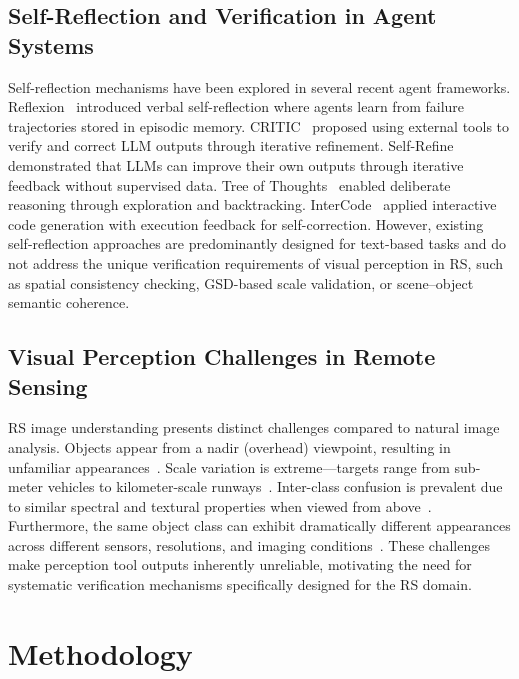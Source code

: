 \documentclass[journal]{IEEEtran}
\begin{document}
\subsection{Self-Reflection and Verification in Agent Systems}

Self-reflection mechanisms have been explored in several recent agent frameworks.
Reflexion~\cite{Reflexion} introduced verbal self-reflection where agents learn from failure trajectories stored in episodic memory.
CRITIC~\cite{CRITIC} proposed using external tools to verify and correct LLM outputs through iterative refinement.
Self-Refine~\cite{SelfRefine} demonstrated that LLMs can improve their own outputs through iterative feedback without supervised data.
Tree of Thoughts~\cite{ToT} enabled deliberate reasoning through exploration and backtracking.
InterCode~\cite{InterCode} applied interactive code generation with execution feedback for self-correction.
However, existing self-reflection approaches are predominantly designed for text-based tasks and do not address the unique verification requirements of visual perception in RS, such as spatial consistency checking, GSD-based scale validation, or scene--object semantic coherence.

\subsection{Visual Perception Challenges in Remote Sensing}

RS image understanding presents distinct challenges compared to natural image analysis.
Objects appear from a nadir (overhead) viewpoint, resulting in unfamiliar appearances~\cite{DOTA}.
Scale variation is extreme---targets range from sub-meter vehicles to kilometer-scale runways~\cite{xView}.
Inter-class confusion is prevalent due to similar spectral and textural properties when viewed from above~\cite{DIOR}.
Furthermore, the same object class can exhibit dramatically different appearances across different sensors, resolutions, and imaging conditions~\cite{FAIR1M}.
These challenges make perception tool outputs inherently unreliable, motivating the need for systematic verification mechanisms specifically designed for the RS domain.


\section{Methodology}
\label{sec:methodology}
\end{document}

